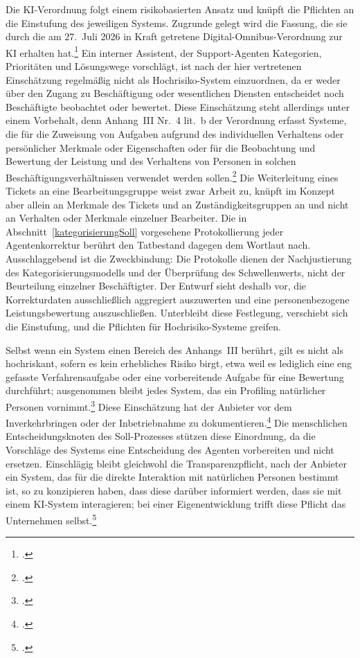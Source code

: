 Die KI-Verordnung folgt einem risikobasierten Ansatz und kn\"upft die Pflichten an die Einstufung des jeweiligen Systems. Zugrunde gelegt wird die Fassung, die sie durch die am 27.~Juli 2026 in Kraft getretene Digital-Omnibus-Verordnung zur KI erhalten hat.\footcite[Vgl.][Art.~4]{KIVO2026} Ein interner Assistent, der Support-Agenten Kategorien, Priorit\"aten und L\"osungswege vorschl\"agt, ist nach der hier vertretenen Einsch\"atzung regelm\"a{\ss}ig nicht als Hochrisiko-System einzuordnen, da er weder \"uber den Zugang zu Besch\"aftigung oder wesentlichen Diensten entscheidet noch Besch\"aftigte beobachtet oder bewertet. Diese Einsch\"atzung steht allerdings unter einem Vorbehalt, denn Anhang~III Nr.~4 lit.~b der Verordnung erfasst Systeme, die \glqq f\"ur die Zuweisung von Aufgaben aufgrund des individuellen Verhaltens oder pers\"onlicher Merkmale oder Eigenschaften oder f\"ur die Beobachtung und Bewertung der Leistung und des Verhaltens von Personen in solchen Besch\"aftigungsverh\"altnissen verwendet werden sollen\grqq{}.\footcite[Anhang~III Nr.~4 lit.~b]{KIVO} Die Weiterleitung eines Tickets an eine Bearbeitungsgruppe weist zwar Arbeit zu, kn\"upft im Konzept aber allein an Merkmale des Tickets und an Zust\"andigkeitsgruppen an und nicht an Verhalten oder Merkmale einzelner Bearbeiter. Die in Abschnitt~\ref{kategorisierungSoll} vorgesehene Protokollierung jeder Agentenkorrektur ber\"uhrt den Tatbestand dagegen dem Wortlaut nach. Ausschlaggebend ist die Zweckbindung: Die Protokolle dienen der Nachjustierung des Kategorisierungsmodells und der \"Uberpr\"ufung des Schwellenwerts, nicht der Beurteilung einzelner Besch\"aftigter. Der Entwurf sieht deshalb vor, die Korrekturdaten ausschlie{\ss}lich aggregiert auszuwerten und eine personenbezogene Leistungsbewertung auszuschlie{\ss}en. Unterbleibt diese Festlegung, verschiebt sich die Einstufung, und die Pflichten f\"ur Hochrisiko-Systeme greifen.

Selbst wenn ein System einen Bereich des Anhangs~III ber\"uhrt, gilt es nicht als hochriskant, sofern es kein erhebliches Risiko birgt, etwa weil es lediglich eine eng gefasste Verfahrensaufgabe oder eine vorbereitende Aufgabe f\"ur eine Bewertung durchf\"uhrt; ausgenommen bleibt jedes System, das ein Profiling nat\"urlicher Personen vornimmt.\footcite[Vgl.][Art.~6 Abs.~3]{KIVO} Diese Einsch\"atzung hat der Anbieter vor dem Inverkehrbringen oder der Inbetriebnahme zu dokumentieren.\footcite[Vgl.][Art.~6 Abs.~4]{KIVO} Die menschlichen Entscheidungsknoten des Soll-Prozesses st\"utzen diese Einordnung, da die Vorschl\"age des Systems eine Entscheidung des Agenten vorbereiten und nicht ersetzen. Einschl\"agig bleibt gleichwohl die Transparenzpflicht, nach der Anbieter ein System, das f\"ur die direkte Interaktion mit nat\"urlichen Personen bestimmt ist, so zu konzipieren haben, dass diese dar\"uber informiert werden, dass sie mit einem KI-System interagieren; bei einer Eigenentwicklung trifft diese Pflicht das Unternehmen selbst.\footcite[Vgl.][Art.~50 Abs.~1]{KIVO}

